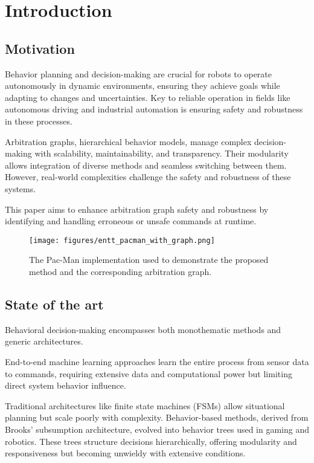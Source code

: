 \section{Introduction}

\subsection{Motivation}

Behavior planning and decision-making are crucial for robots to operate autonomously in dynamic environments, ensuring they achieve goals while adapting to changes and uncertainties.
Key to reliable operation in fields like autonomous driving and industrial automation is ensuring safety and robustness in these processes.

Arbitration graphs, hierarchical behavior models, manage complex decision-making with scalability, maintainability, and transparency.
Their modularity allows integration of diverse methods and seamless switching between them.
However, real-world complexities challenge the safety and robustness of these systems.

This paper aims to enhance arbitration graph safety and robustness by identifying and handling erroneous or unsafe commands at runtime.

\begin{figure}
    \centering
    \texttt{[image: figures/entt\_pacman\_with\_graph.png]}
    \caption{The Pac-Man implementation used to demonstrate the proposed method and the corresponding arbitration graph.}
    \label{fig:entt-pacman}
\end{figure}

\subsection{State of the art}
Behavioral decision-making encompasses both monothematic methods and generic architectures.

End-to-end machine learning approaches learn the entire process from sensor data to commands, requiring extensive data and computational power but limiting direct system behavior influence.

Traditional architectures like finite state machines (FSMs) allow situational planning but scale poorly with complexity. Behavior-based methods, derived from Brooks' subsumption architecture, evolved into behavior trees used in gaming and robotics. These trees structure decisions hierarchically, offering modularity and responsiveness but becoming unwieldy with extensive conditions.

